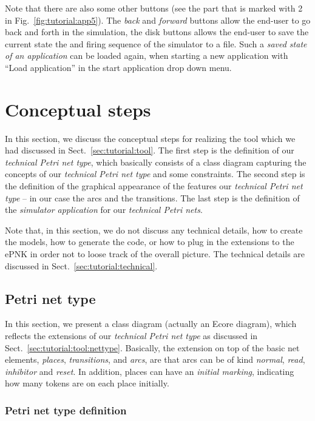Note that there are also some other buttons  (see the part that is marked with 2
in Fig.~\ref{fig:tutorial:app5}). The \emph{back} and  \emph{forward} buttons
allow the end-user to go back and forth in the simulation, the disk buttons 
allows the end-user to save the current state the and firing sequence of the
simulator to a file.
Such a \emph{saved state of an application} can be loaded again, when starting
a new application with ``Load application'' in the start application
drop down menu.

\section{Conceptual steps}
\label{sec:tutorial:concepts}

In this section, we discuss the conceptual steps for realizing the tool which we
had discussed in Sect.~\ref{sec:tutorial:tool}.
The first step is the definition of our \emph{technical Petri net type}, which
basically consists of a class diagram capturing the concepts of our \emph{technical Petri net type}
and some constraints. The second step is the definition of the graphical
appearance of the features our \emph{technical Petri net type} -- in our case
the arcs and the transitions. The last step is the definition of the
\emph{simulator application} for our \emph{technical Petri nets}.

Note that, in this section, we do not discuss any technical details, how to
create the models, how to generate the code, or how to plug in the
extensions to the ePNK in order not to loose track of the overall picture.
The technical details are discussed in Sect.~\ref{sec:tutorial:technical}.

\subsection{Petri net type}
\label{subsec:tutorial:concepts:pnt}

In this section, we present a class diagram (actually an Ecore diagram),
which reflects the extensions of our \emph{technical Petri net type} as
discussed in Sect.~\ref{sec:tutorial:tool:nettype}. Basically, the extension
on top of the basic net elements, \emph{places}, \emph{transitions}, and
\emph{arcs}, are that arcs can be of kind \emph{normal}, \emph{read},
\emph{inhibitor} and \emph{reset}. In addition, places can have an
\emph{initial marking}, indicating how many tokens are on each place
initially.

\subsubsection{Petri net type definition}
\label{subsubsec:tutorial:concepts:pntd}

